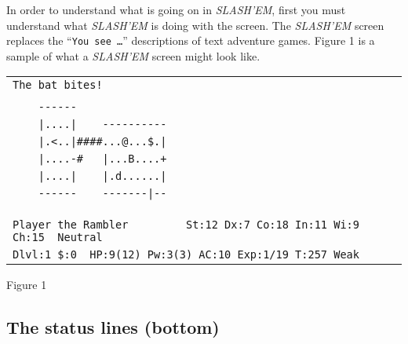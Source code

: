 In order to understand what is going on in {\it SLASH'EM}, first you must
understand what {\it SLASH'EM\/} is doing with the screen.  The {\it SLASH'EM\/} screen
replaces the ``{\tt You see  \ldots}'' descriptions of text adventure games.
Figure 1 is a sample of what a {\it SLASH'EM\/} screen might look like.

\begin{center}
\begin{tabular}{l}
\verb~The bat bites!                                                       ~\\
                                                                            \\
\verb~    ------                                                           ~\\
\verb~    |....|    ----------                                             ~\\
\verb~    |.<..|####...@...$.|                                             ~\\
\verb~    |....-#   |...B....+                                             ~\\
\verb~    |....|    |.d......|                                             ~\\
\verb~    ------    -------|--                                             ~\\
                                                                            \\
                                                                            \\
                                                                            \\
\verb~Player the Rambler         St:12 Dx:7 Co:18 In:11 Wi:9 Ch:15  Neutral~\\
\verb~Dlvl:1 $:0  HP:9(12) Pw:3(3) AC:10 Exp:1/19 T:257 Weak               ~\\
                                                                            
\end{tabular}
\end{center}
\begin{center}
Figure 1
\end{center}

\subsection*{The status lines (bottom)}


